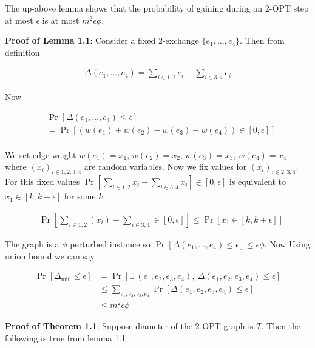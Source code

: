 \documentclass[12pt, a4paper]{article}
\begin{document}
\noindent The up-above lemma shows that the probability of gaining during an
2-{\sf OPT} step at most $\epsilon$ is at most $m^2 \epsilon \phi$.

\noindent \textbf{Proof of Lemma 1.1}: Consider a fixed 2-exchange
$\{e_1, \dots, e_4\}$. Then from definition

\begin{align*}
    \Delta(e_1, \dots, e_4) = \displaystyle\sum_{i \in {1,2}} e_i - \displaystyle\sum_{i \in {3,4}} e_i
\end{align*}

\noindent Now

\begin{align*}
    &\Pr[\Delta(e_1, \dots, e_4) \leq \epsilon]\\
    &= \Pr[\left(w(e_1) + w(e_2) - w(e_3) - w(e_4)\right) \in [0, \epsilon]]\\
\end{align*}

\noindent We set edge weight $w(e_1) = x_1$, $w(e_2) = x_2$, $w(e_3) = x_3$, 
$w(e_4) = x_4$ where $(x_i)_{i \in {1,2,3,4}}$ are random variables. Now we fix values for 
$(x_i)_{i \in {2,3,4}}$. For this fixed values 
$\Pr\left[\sum_{i \in {1,2}} x_i - \sum_{i \in {3,4}}  x_i\right] \in [0, \epsilon]$ is equivalent
to $x_1 \in [k, k + \epsilon]$ for some $k$.

\begin{align*}
    &\Pr\left[\sum_{i \in {1,2}} (x_i) - \sum_{i \in {3,4}} \in [0, \epsilon]\right]
    \leq \Pr\left[x_1 \in [k, k + \epsilon]\right]
\end{align*}

\noindent The graph is a $\phi$ perturbed instance so $\Pr[\Delta(e_1, \dots, e_4) \leq \epsilon] \leq \epsilon \phi$. Now
Using union bound we can say

\begin{align*}
    \Pr[\Delta_{\text{min}} \leq \epsilon] &= \Pr\left[\exists \: (e_1, e_2, e_3, e_4), \: \Delta(e_1, e_2, e_3, e_4) \leq \epsilon\right]\\
    &\leq \displaystyle\sum_{e_1, e_2, e_3, e_4} \Pr[\Delta(e_1, e_2, e_3, e_4) \leq \epsilon]\\
    &\leq m^2 \epsilon \phi
\end{align*}

\bigskip

\noindent \textbf{Proof of Theorem 1.1}: Suppose diameter of the 2-{\sf OPT} graph is $T$. Then the
following is true from lemma 1.1
\end{document}
